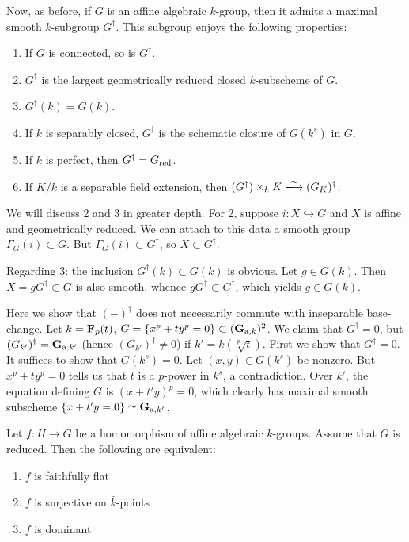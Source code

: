 \documentclass{article}
\begin{document}
Now, as before, if $G$ is an affine algebraic $k$-group, then it admits a 
maximal smooth $k$-subgroup $G^\dagger$. This subgroup enjoys the following 
properties: 
\begin{enumerate}
  \item If $G$ is connected, so is $G^\dagger$. 
  \item $G^\dagger$ is the largest geometrically reduced closed $k$-subscheme of $G$. 
  \item $G^\dagger(k) = G(k)$. 
  \item If $k$ is separably closed, $G^\dagger$ is the schematic closure of 
    $G(k^s)$ in $G$. 
  \item If $k$ is perfect, then $G^\dagger = G_{\mathrm{red}}$. 
  \item If $K/k$ is a separable field extension, then 
    $(G^\dagger)\times_k K \isomorphism (G_K)^\dagger$. 
\end{enumerate}

We will discuss 2 and 3 in greater depth. For 2, suppose 
$i:X\hookrightarrow G$ and $X$ is affine and geometrically reduced. We can 
attach to this data a smooth group $\Gamma_G(i)\subset G$. But 
$\Gamma_G(i)\subset G^\dagger$, so $X\subset G^\dagger$. 

Regarding 3: the inclusion $G^\dagger(k)\subset G(k)$ is obvious. Let 
$g\in G(k)$. Then $X=g G^\dagger\subset G$ is also smooth, whence 
$g G^\dagger\subset G^\dagger$, which yields $g\in G(k)$. 

\begin{example}
Here we show that $(-)^\dagger$ does not necessarily commute with inseparable 
base-change. Let $k=\mathbf{F}_p(t)$, $G=\{x^p+t y^p=0\}\subset (\mathbf{G}_{\mathrm{a},k})^2$. 
We claim that $G^\dagger=0$, but $(G_{k'})^\dagger = \mathbf{G}_{\mathrm{a}, k'}$ (hence 
$(G_{k'})^\dagger \ne 0$) if $k'=k(\sqrt[p] t)$. 
First we show that $G^\dagger=0$. It suffices to show that $G(k^s)=0$. Let 
$(x,y)\in G(k^s)$ be nonzero. But $x^p+t y^p=0$ tells us that $t$ is a 
$p$-power in $k^s$, a contradiction. Over $k'$, the equation defining $G$ 
is $(x+t' y)^p=0$, which clearly has maximal smooth subscheme
$\{x+t' y=0\} \simeq \mathbf{G}_{\mathrm{a},k'}$. 
\end{example}


\begin{proposition}
Let $f:H\to G$ be a homomorphism of affine algebraic $k$-groups. Assume that 
$G$ is reduced. Then the following are equivalent:
\begin{enumerate}
  \item $f$ is faithfully flat
  \item $f$ is surjective on $\bar k$-points
  \item $f$ is dominant 
\end{enumerate}
\end{proposition}
\end{document}
